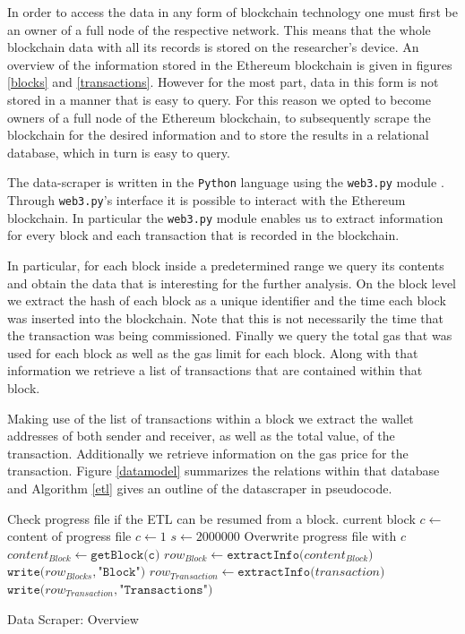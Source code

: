 In order to access the data in any form of blockchain technology one must first be an owner of a full node of the respective network. 
This means that the whole blockchain data with all its records is stored on the researcher's device.
An overview of the information stored in the Ethereum blockchain is given in figures \ref{blocks} and \ref{transactions}.
However for the most part, data in this form is not stored in a manner that is easy to query. 
For this reason we opted to become owners of a full node of the Ethereum blockchain, to subsequently scrape the blockchain for the desired information and to store the results in a relational database, which in turn is easy to query.

The data-scraper is written in the \texttt{Python} language using the \texttt{web3.py} module \cite{Python, web3}.
Through \texttt{web3.py}'s interface it is possible to interact with the Ethereum blockchain. 
In particular the \texttt{web3.py} module enables us to extract information for every block and each transaction that is recorded in the blockchain.

In particular, for each block inside a predetermined range we query its contents and obtain the data that is interesting for the further analysis. 
On the block level we extract the hash of each block as a unique identifier and the time each block was inserted into the blockchain. 
Note that this is not necessarily the time that the transaction was being commissioned. 
Finally we query the total gas that was used for each block as well as the gas limit for each block. 
Along with that information we retrieve a list of transactions that are contained within that block.

Making use of the list of transactions within a block we extract the wallet addresses of both sender and receiver, as well as the total value, of the transaction. 
Additionally we retrieve information on the gas price for the transaction. 
Figure \ref{datamodel} summarizes the relations within that database and Algorithm \ref{etl} gives an outline of the datascraper in pseudocode.


\begin{algorithm}
\begin{algorithmic}
\State Check progress file if the ETL can be resumed from a block.
    \State current block $c \gets$ content of progress file
\Else
    \State $c \gets 1$
\EndIf
\State $s \gets 2000000$ 
   \State Overwrite progress file with $c$ 
   \State $content_{Block} \gets \texttt{getBlock(c)}$
   \State $row_{Block} \gets \texttt{extractInfo(}content_{Block}\texttt{)}$
   \State $\texttt{write(} row_{Blocks}, \texttt{"Block")}$
       \State $row_{Transaction} \gets \texttt{extractInfo(}transaction\texttt{)}$
       \State $\texttt{write(} row_{Transaction}, \texttt{"Transactions")}$
   \EndFor
\EndWhile
\end{algorithmic}
\caption{Data Scraper: Overview}
\label{etl}
\end{algorithm}
